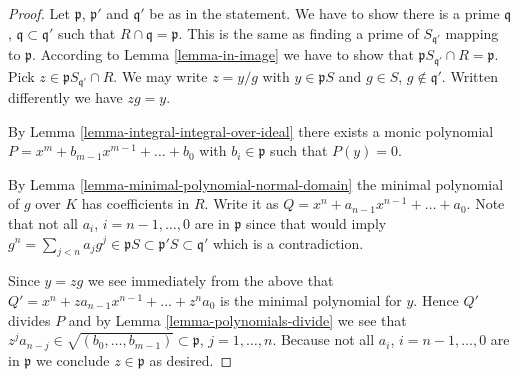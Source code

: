 \begin{proof}
Let $\mathfrak p$, $\mathfrak p'$ and $\mathfrak q'$
be as in the statement. We have to show there is a prime
$\mathfrak q$, $\mathfrak q \subset \mathfrak q'$ such that
$R \cap \mathfrak q = \mathfrak p$. This is the same
as finding a prime of
$S_{\mathfrak q'}$ mapping to $\mathfrak p$.
According to Lemma \ref{lemma-in-image} we have to show
that $\mathfrak p S_{\mathfrak q'} \cap R
= \mathfrak p$. Pick $z \in \mathfrak p S_{\mathfrak q'} \cap R$.
We may write $z = y/g$ with $y \in \mathfrak pS$ and
$g \in S$, $g \not\in \mathfrak q'$. Written
differently we have $zg = y$.

\medskip\noindent
By Lemma \ref{lemma-integral-integral-over-ideal}
there exists a monic polynomial
$P = x^m + b_{m-1} x^{m-1} + \ldots + b_0$
with $b_i \in \mathfrak p$ such that $P(y) = 0$.

\medskip\noindent
By Lemma \ref{lemma-minimal-polynomial-normal-domain}
the minimal polynomial of $g$ over $K$ has coefficients
in $R$. Write it as $Q = x^n + a_{n-1} x^{n-1} + \ldots
+ a_0$. Note that not all $a_i$, $i = n-1, \ldots, 0$
are in $\mathfrak p$ since that would imply
$g^n = \sum_{j < n} a_j g^j \in \mathfrak pS
\subset \mathfrak p'S
\subset \mathfrak q'$
which is a contradiction.

\medskip\noindent
Since $y = zg$ we see immediately from the above
that $Q' = x^n + za_{n-1} x^{n-1} + \ldots + z^{n}a_0$
is the minimal polynomial for $y$. Hence
$Q'$ divides $P$ and by Lemma \ref{lemma-polynomials-divide}
we see that $z^ja_{n - j} \in \sqrt{(b_0, \ldots, b_{m-1})}
\subset \mathfrak p$, $j =  1, \ldots, n$.
Because not all $a_i$, $i = n-1, \ldots, 0$
are in $\mathfrak p$ we conclude $z \in \mathfrak p$
as desired.
\end{proof}






































